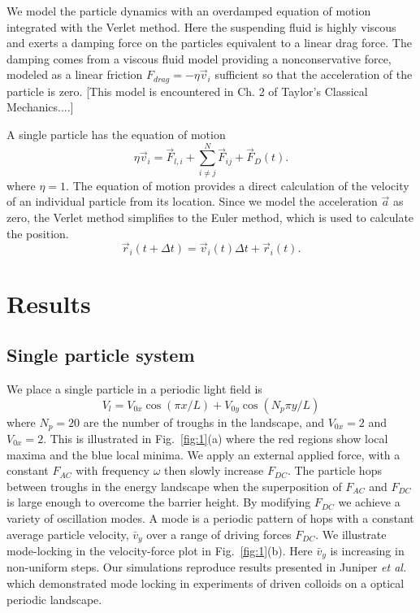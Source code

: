 \documentclass[prb,preprint]{revtex4}
\begin{document}
We model the 
particle dynamics 
with an overdamped
equation of motion
integrated with the Verlet method.
Here 
the suspending fluid is highly viscous
and exerts a damping force on the particles equivalent
to a linear drag force.
The damping comes from a viscous fluid model
providing a nonconservative force,
modeled as a linear friction $F_{drag} = -\eta \vec{v}_i$
sufficient so that
the acceleration of the particle is zero.
[This model is encountered in Ch. 2 of Taylor's Classical Mechanics....]

A single particle has the equation of motion 
\begin{equation}
\eta \vec{v}_i = \vec{F}_{l,i} + \sum_{i \neq j}^{N} \vec{F}_{ij} + \vec{F}_{D}(t).
\end{equation}
where $\eta = 1$.
The equation of motion provides a direct calculation of the velocity
of an individual particle from its location.
Since we model the acceleration $\vec{a}$ as zero,
the Verlet method simplifies to 
the Euler method,
which is used to calculate the position. %
\begin{equation}
\vec{r}_i(t+\Delta t) = \vec{v}_i(t) \Delta t + \vec{r}_i(t).
\end{equation} 




\section{Results}
\label{sec:results}

\subsection{Single particle system}
\label{sec:one}

We place a single particle in a periodic light field is
\begin{equation}
  V_l = V_{0x} \cos{(\pi x/L)} + V_{0y} \cos{(N_p \pi y / L)} 
\end{equation}
where $N_p=20$ are the number of troughs in the landscape,
and $V_{0x}=2$ and $V_{0x}=2$.
This is illustrated in Fig.~\ref{fig:1}(a) where
the red regions show local maxima and the blue local minima.
We apply an external applied force, 
with 
a constant $F_{AC}$ with frequency $\omega$ then slowly increase $F_{DC}$.
The particle hops between troughs in the energy landscape
when the superposition of $F_{AC}$ and $F_{DC}$ is large enough
to overcome the barrier height.
By modifying $F_{DC}$ we 
achieve a variety of oscillation modes.
A mode is a periodic pattern of hops
with a constant average particle velocity, $\bar{v}_{y}$
over a range of driving forces $F_{DC}$.
We illustrate mode-locking in 
the velocity-force plot in Fig.~\ref{fig:1}(b).
Here $\bar{v}_{y}$ is increasing in non-uniform steps.
Our simulations reproduce results presented in 
Juniper {\it et al.} \cite{juniper2015}
which demonstrated
mode locking in
experiments of 
driven colloids on a
optical periodic landscape.
\end{document}
